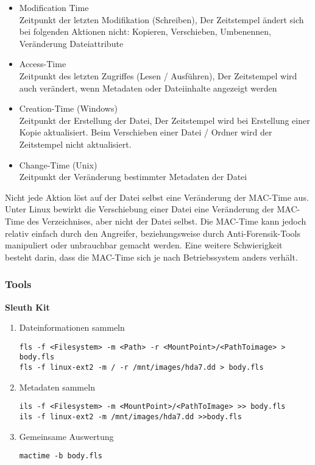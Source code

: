 \begin{itemize}
\item Modification Time\\
Zeitpunkt der letzten Modifikation (Schreiben), Der Zeitstempel ändert sich bei folgenden Aktionen nicht: Kopieren, Verschieben, Umbenennen, Veränderung Dateiattribute
\item Access-Time\\
Zeitpunkt des letzten Zugriffes (Lesen / Ausführen), Der Zeitstempel wird auch verändert, wenn Metadaten oder Dateiinhalte angezeigt werden
\item Creation-Time (Windows)\\
Zeitpunkt der Erstellung der Datei, Der Zeitstempel wird bei Erstellung einer Kopie aktualisiert. Beim Verschieben einer Datei / Ordner wird der Zeitstempel nicht aktualisiert.
\item Change-Time (Unix)\\
Zeitpunkt der Veränderung bestimmter Metadaten der Datei
\end{itemize}

Nicht jede Aktion löst auf der Datei selbst eine Veränderung der MAC-Time aus. Unter Linux bewirkt die Verschiebung einer Datei eine Veränderung der MAC-Time des Verzeichnises, aber nicht der Datei selbst. Die MAC-Time kann jedoch relativ einfach durch den Angreifer, beziehungsweise durch Anti-Forensik-Tools manipuliert oder unbrauchbar gemacht werden. Eine weitere Schwierigkeit besteht darin, dass die MAC-Time sich je nach Betriebssystem anders verhält.

\subsubsection{Tools}
\textbf{Sleuth Kit}
\begin{enumerate}
\item Dateinformationen sammeln
\begin{verbatim}
fls -f <Filesystem> -m <Path> -r <MountPoint>/<PathToimage> > body.fls
fls -f linux-ext2 -m / -r /mnt/images/hda7.dd > body.fls
\end{verbatim}

\item Metadaten sammeln
\begin{verbatim}
ils -f <Filesystem> -m <MountPoint>/<PathToImage> >> body.fls
ils -f linux-ext2 -m /mnt/images/hda7.dd >>body.fls
\end{verbatim}

\item Gemeinsame Auswertung
\begin{verbatim}
mactime -b body.fls
\end{verbatim}

\end{enumerate}


